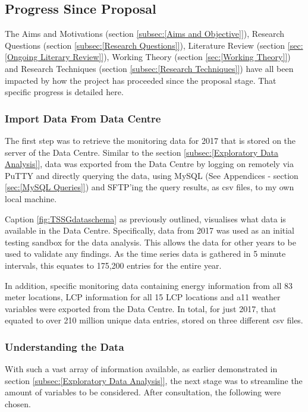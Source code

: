 \documentclass[12pt]{scrartcl}
\begin{document}
\subsection{Progress Since Proposal}
\label{subsec:[Progress Since Proposal]}

The Aims and Motivations (section \ref{subsec:[Aims and Objective]}), Research Questions (section \ref{subsec:[Research Questions]}), Literature Review (section \ref{sec:[Ongoing Literary Review]}), Working Theory (section \ref{sec:[Working Theory]}) and Research Techniques (section \ref{subsec:[Research Techniques]}) have all been impacted by how the project has proceeded since the proposal stage. That specific progress is detailed here.  

\subsubsection{Import Data From Data Centre}
\label{subsubsec:[Import Data From Data Centre]}

The first step was to retrieve the monitoring data for 2017 that is stored on the server of the Data Centre. Similar to the section \ref{subsec:[Exploratory Data Analysis]}, data was exported from the Data Centre by logging on remotely via PuTTY and directly querying the data, using MySQL (See Appendices - section \ref{sec:[MySQL Queries]}) and SFTP'ing the query results, as csv files, to my own local machine. 

Caption \ref{fig:TSSGdataschema} as previously outlined, visualises what data is available in the Data Centre. Specifically, data from 2017 was used as an initial testing sandbox for the data analysis. This allows the data for other years to be used to validate any findings. As the time series data is gathered in 5 minute intervals, this equates to 175,200 entries for the entire year. 

In addition, specific monitoring data containing energy information from all 83 meter locations, \gls{LCP} information for all 15 \gls{LCP} locations and a11 weather variables were exported from the Data Centre. In total, for just 2017, that equated to over 210 million unique data entries, stored on three different csv files. 

\subsubsection{Understanding the Data}
\label{subsubsec:[Understanding the Data]}

With such a vast array of information available, as earlier demonstrated in section \ref{subsec:[Exploratory Data Analysis]}, the next stage was to streamline the amount of variables to be considered. After consultation, the following were chosen.  
\end{document}
